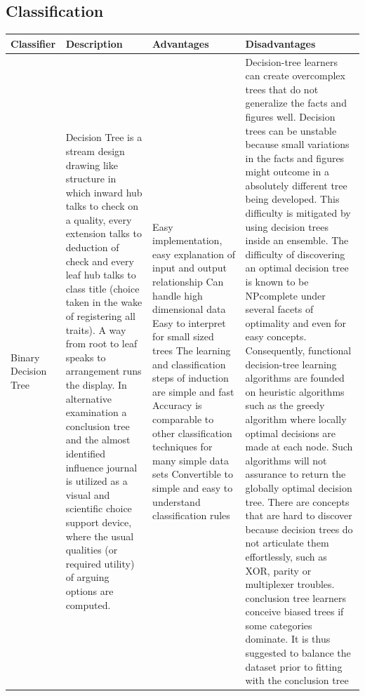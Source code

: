 \documentclass[12pt, letterpaper]{article}
\begin{document}
\subsection{Classification}
\begin{center}
		\begin{longtable}{p{2cm}|p{3cm}|p{3cm}|p{3cm}}
		\hline
			Classifier & Description & Advantages & Disadvantages  \\
			 
			\hline
   Binary   Decision Tree & Decision Tree is a stream design drawing like structure in which inward hub talks to check on a quality, every extension talks to deduction of check and every leaf hub talks to class title (choice taken in the wake of registering all traits). A way from root to leaf speaks to arrangement runs the display. In alternative examination a conclusion tree and the almost identified influence journal is utilized as a visual and scientific choice support device, where the usual qualities (or required utility) of arguing options are computed. & Easy implementation, easy explanation of input and output relationship Can handle high dimensional data Easy to interpret for small sized trees The learning and classification steps of induction are simple and fast Accuracy is comparable to other classification techniques for many simple data sets Convertible to simple and easy to understand classification rules & Decision-tree learners can create overcomplex trees that do not generalize the facts and figures well. Decision trees can be unstable because small variations in the facts and figures might outcome in a absolutely different tree being developed. This difficulty is mitigated by using decision trees inside an ensemble. The difficulty of discovering an optimal decision tree is known to be NPcomplete under several facets of optimality and even for easy concepts. Consequently, functional decision-tree learning algorithms are founded on heuristic algorithms such as the greedy algorithm where locally optimal decisions are made at each node. Such algorithms will not assurance to return the globally optimal decision tree. There are concepts that are hard to discover because decision trees do not articulate them effortlessly, such as XOR, parity or multiplexer troubles. conclusion tree learners conceive biased trees if some categories dominate. It is thus suggested to balance the dataset prior to fitting with the conclusion tree\\
			\hline

\end{longtable}
\end{center}
\end{document}
